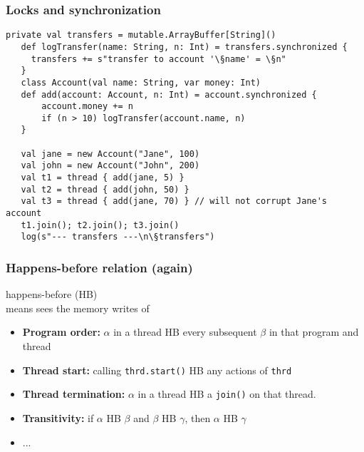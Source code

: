\documentclass[aspectratio=169]{beamer}
\begin{document}
\begin{frame}[fragile]\frametitle{Locks and synchronization}
\begin{lstlisting}[emph={assert,sleep,log,thread,join,synchronized}]
   private val transfers = mutable.ArrayBuffer[String]()
   def logTransfer(name: String, n: Int) = transfers.synchronized {
     transfers += s"transfer to account '\§name' = \§n"
   }
   class Account(val name: String, var money: Int)
   def add(account: Account, n: Int) = account.synchronized {
       account.money += n
       if (n > 10) logTransfer(account.name, n)
   }

   val jane = new Account("Jane", 100)
   val john = new Account("John", 200)
   val t1 = thread { add(jane, 5) }
   val t2 = thread { add(john, 50) }
   val t3 = thread { add(jane, 70) } // will not corrupt Jane's account
   t1.join(); t2.join(); t3.join()
   log(s"--- transfers ---\n\§transfers")
\end{lstlisting}
\end{frame}


\begin{frame}\frametitle{Happens-before relation (again)}
\centering

 \alert{happens-before (HB)} \\
means   sees the memory writes of 

\begin{itemize}
\item \textbf{Program order:} $\alpha$ in a thread \alert{HB} every subsequent $\beta$ in that program and thread
\item \textbf{Thread start:} calling \texttt{thrd.start()} \alert{HB} any actions of \texttt{thrd}
\item \textbf{Thread termination:} $\alpha$ in a thread \alert{HB} a \texttt{join()} on that thread.
\item \textbf{Transitivity:} if $\alpha$ \alert{HB} $\beta$ and $\beta$ \alert{HB} $\gamma$, then $\alpha$ \alert{HB} $\gamma$
\item ...
\end{itemize}

\end{frame}
\end{document}
